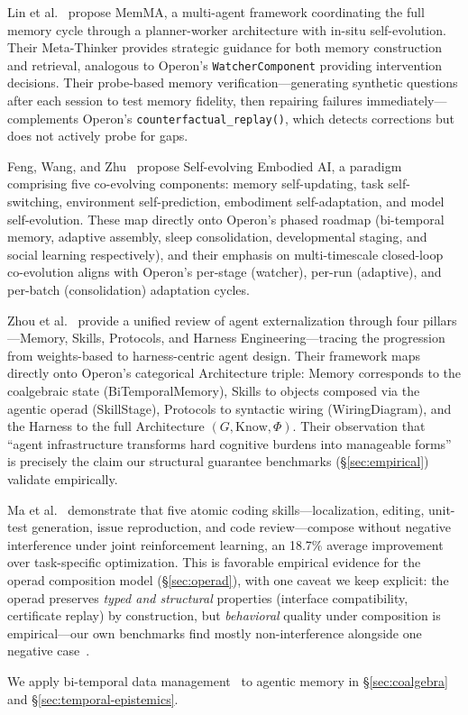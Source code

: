 Lin et al.~\cite{lin2026memma} propose MemMA, a multi-agent framework coordinating the full memory cycle through a planner-worker architecture with in-situ self-evolution. Their Meta-Thinker provides strategic guidance for both memory construction and retrieval, analogous to Operon's \texttt{WatcherComponent} providing intervention decisions. Their probe-based memory verification---generating synthetic questions after each session to test memory fidelity, then repairing failures immediately---complements Operon's \texttt{counterfactual\_replay()}, which detects corrections but does not actively probe for gaps.

Feng, Wang, and Zhu~\cite{feng2026selfevolving} propose Self-evolving Embodied AI, a paradigm comprising five co-evolving components: memory self-updating, task self-switching, environment self-prediction, embodiment self-adaptation, and model self-evolution. These map directly onto Operon's phased roadmap (bi-temporal memory, adaptive assembly, sleep consolidation, developmental staging, and social learning respectively), and their emphasis on multi-timescale closed-loop co-evolution aligns with Operon's per-stage (watcher), per-run (adaptive), and per-batch (consolidation) adaptation cycles.

Zhou et al.~\cite{zhou2026externalization} provide a unified review of agent externalization through four pillars---Memory, Skills, Protocols, and Harness Engineering---tracing the progression from weights-based to harness-centric agent design.  Their framework maps directly onto Operon's categorical Architecture triple: Memory corresponds to the coalgebraic state (BiTemporalMemory), Skills to objects composed via the agentic operad (SkillStage), Protocols to syntactic wiring (WiringDiagram), and the Harness to the full Architecture $(G, \mathrm{Know}, \Phi)$.  Their observation that ``agent infrastructure transforms hard cognitive burdens into manageable forms'' is precisely the claim our structural guarantee benchmarks (\S\ref{sec:empirical}) validate empirically.

Ma et al.~\cite{ma2026atomic} demonstrate that five atomic coding skills---localization, editing, unit-test generation, issue reproduction, and code review---compose without negative interference under joint reinforcement learning, an 18.7\% average improvement over task-specific optimization. This is favorable empirical evidence for the operad composition model (\S\ref{sec:operad}), with one caveat we keep explicit: the operad preserves \emph{typed and structural} properties (interface compatibility, certificate replay) by construction, but \emph{behavioral} quality under composition is empirical---our own benchmarks find mostly non-interference alongside one negative case~\cite{banu2026benchmarks}.

We apply bi-temporal data management~\cite{snodgrass2000temporal, kulkarni2012temporal} to agentic memory in \S\ref{sec:coalgebra} and \S\ref{sec:temporal-epistemics}.

